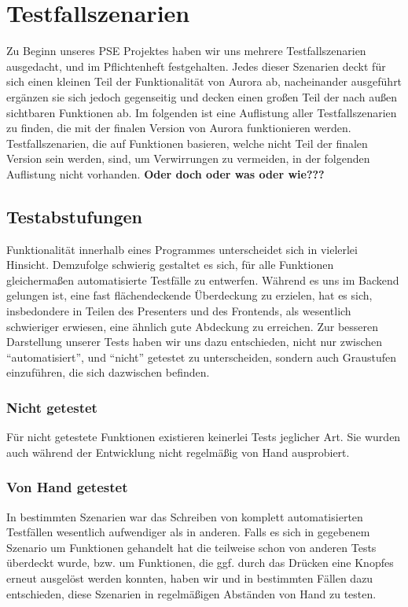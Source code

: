 \documentclass[parskip=full,11pt,twoside]{scrartcl}
\begin{document}
\section{Testfallszenarien}
Zu Beginn unseres PSE Projektes haben wir uns mehrere Testfallszenarien ausgedacht, und im Pflichtenheft festgehalten.
Jedes dieser Szenarien deckt für sich einen kleinen Teil der Funktionalität von Aurora ab, nacheinander ausgeführt ergänzen sie sich jedoch gegenseitig und decken einen großen Teil der nach außen sichtbaren Funktionen ab.
Im folgenden ist eine Auflistung aller Testfallszenarien zu finden, die mit der finalen Version von Aurora funktionieren werden.
Testfallszenarien, die auf Funktionen basieren, welche nicht Teil der finalen Version sein werden, sind, um Verwirrungen zu vermeiden, in der folgenden Auflistung nicht vorhanden.
\newline
\textbf{Oder doch oder was oder wie???}




\subsection{Testabstufungen}
Funktionalität innerhalb eines Programmes unterscheidet sich in vielerlei Hinsicht.
Demzufolge schwierig gestaltet es sich, für alle Funktionen gleichermaßen automatisierte Testfälle zu entwerfen.
Während es uns im Backend gelungen ist, eine fast flächendeckende Überdeckung zu erzielen, hat es sich, insbedondere in Teilen des Presenters und des Frontends, als wesentlich schwieriger erwiesen, eine ähnlich gute Abdeckung zu erreichen.
Zur besseren Darstellung unserer Tests haben wir uns dazu entschieden, nicht nur zwischen \enquote{automatisiert}, und \enquote{nicht} getestet zu unterscheiden, sondern auch Graustufen einzuführen, die sich dazwischen befinden.

\subsubsection{Nicht getestet}
Für nicht getestete Funktionen existieren keinerlei Tests jeglicher Art.
Sie wurden auch während der Entwicklung nicht regelmäßig von Hand ausprobiert.

\subsubsection{Von Hand getestet}
In bestimmten Szenarien war das Schreiben von komplett automatisierten Testfällen wesentlich aufwendiger als in anderen.
Falls es sich in gegebenem Szenario um Funktionen gehandelt hat die teilweise schon von anderen Tests überdeckt wurde,
    bzw. um Funktionen, die ggf. durch das Drücken eine Knopfes erneut ausgelöst werden konnten, haben wir und in bestimmten Fällen dazu entschieden,
    diese Szenarien in regelmäßigen Abständen von Hand zu testen.
\end{document}
